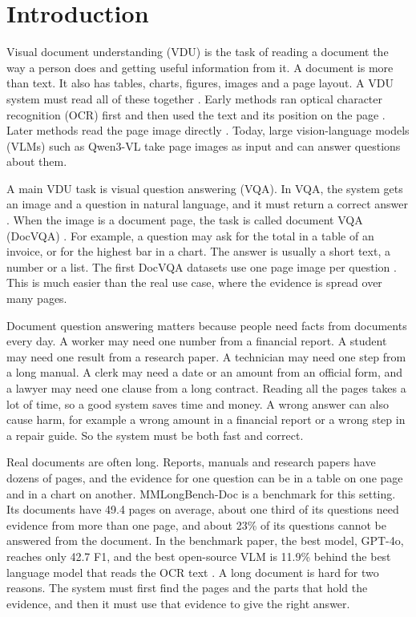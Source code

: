 \section{Introduction}
\label{sec:intro}

Visual document understanding (VDU) is the task of reading a document the way a person does and getting useful information from it. A document is more than text. It also has tables, charts, figures, images and a page layout. A VDU system must read all of these together \cite{xu2020layoutlm,kim2022donut}. Early methods ran optical character recognition (OCR) first and then used the text and its position on the page \cite{xu2020layoutlm}. Later methods read the page image directly \cite{kim2022donut}. Today, large vision-language models (VLMs) such as Qwen3-VL \cite{bai2025qwen3vl} take page images as input and can answer questions about them.

A main VDU task is visual question answering (VQA). In VQA, the system gets an image and a question in natural language, and it must return a correct answer \cite{antol2015vqa}. When the image is a document page, the task is called document VQA (DocVQA) \cite{mathew2021docvqa}. For example, a question may ask for the total in a table of an invoice, or for the highest bar in a chart. The answer is usually a short text, a number or a list. The first DocVQA datasets use one page image per question \cite{mathew2021docvqa}. This is much easier than the real use case, where the evidence is spread over many pages.

Document question answering matters because people need facts from documents every day. A worker may need one number from a financial report. A student may need one result from a research paper. A technician may need one step from a long manual. A clerk may need a date or an amount from an official form, and a lawyer may need one clause from a long contract. Reading all the pages takes a lot of time, so a good system saves time and money. A wrong answer can also cause harm, for example a wrong amount in a financial report or a wrong step in a repair guide. So the system must be both fast and correct.

Real documents are often long. Reports, manuals and research papers have dozens of pages, and the evidence for one question can be in a table on one page and in a chart on another. MMLongBench-Doc \cite{ma2024mmlongbench} is a benchmark for this setting. Its documents have 49.4 pages on average, about one third of its questions need evidence from more than one page, and about 23\% of its questions cannot be answered from the document. In the benchmark paper, the best model, GPT-4o, reaches only 42.7 F1, and the best open-source VLM is 11.9\% behind the best language model that reads the OCR text \cite{ma2024mmlongbench}. A long document is hard for two reasons. The system must first find the pages and the parts that hold the evidence, and then it must use that evidence to give the right answer.

